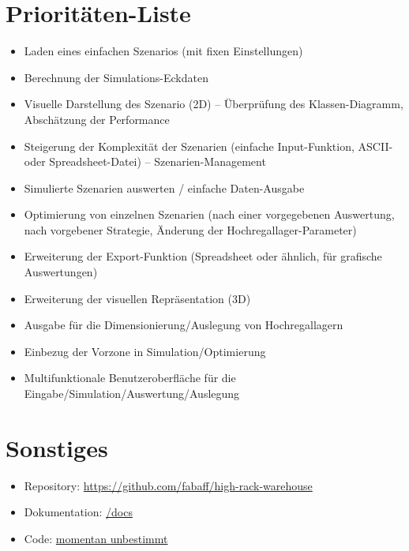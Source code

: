 \documentclass[11pt,a4paper]{article}
\begin{document}
\section{Prioritäten-Liste}
\begin{itemize}
  \item Laden eines einfachen Szenarios (mit fixen Einstellungen)
  \item Berechnung der Simulations-Eckdaten
  \item Visuelle Darstellung des Szenario (2D) -- Überprüfung des Klassen-Diagramm, Abschätzung der Performance
  \item Steigerung der Komplexität der Szenarien (einfache Input-Funktion, ASCII- oder Spreadsheet-Datei) -- Szenarien-Management
  \item Simulierte Szenarien auswerten / einfache Daten-Ausgabe
  \item Optimierung von einzelnen Szenarien (nach einer vorgegebenen Auswertung, nach vorgebener Strategie, Änderung der Hochregallager-Parameter)
  \item Erweiterung der Export-Funktion (Spreadsheet oder ähnlich, für grafische Auswertungen)
  \item Erweiterung der visuellen Repräsentation (3D)
  \item Ausgabe für die Dimensionierung/Auslegung von Hochregallagern
  \item Einbezug der Vorzone in Simulation/Optimierung
  \item Multifunktionale Benutzeroberfläche für die Eingabe/Simulation/Auswertung/Auslegung
\end{itemize}
%
\section{Sonstiges}
\begin{itemize}
  \item Repository: \href{https://github.com/fabaff/high-rack-warehouse}{https://github.com/fabaff/high-rack-warehouse}
  \item Dokumentation: \href{https://github.com/fabaff/high-rack-warehouse/tree/master/docs}{/docs}
  \item Code: \href{https://github.com/fabaff/high-rack-warehouse/}{momentan unbestimmt}
\end{itemize}
\end{document}
